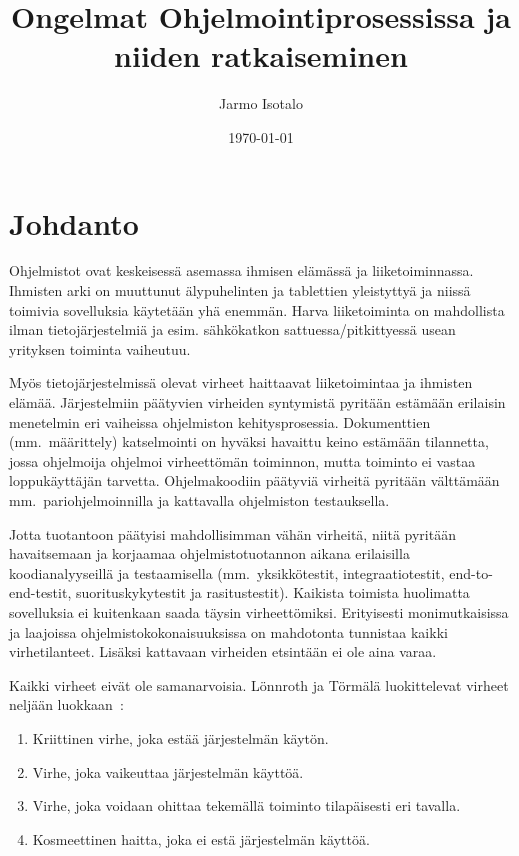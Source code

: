 \documentclass[finnish]{tktltiki2}
\title{Ongelmat Ohjelmointiprosessissa ja niiden ratkaiseminen}
\author{Jarmo Isotalo}
\date{\today}
\theoremstyle{definition}
\theoremstyle{remark}
\begin{document}

\frontmatter      %

\maketitle        %
\makeabstract     %

\tableofcontents  %


\mainmatter       %

\section{Johdanto}

Ohjelmistot ovat keskeisessä asemassa ihmisen elämässä ja liiketoiminnassa. Ihmisten arki on muuttunut älypuhelinten ja tablettien yleistyttyä ja niissä toimivia sovelluksia käytetään yhä enemmän. Harva liiketoiminta on mahdollista ilman tietojärjestelmiä ja esim. sähkökatkon sattuessa/pitkittyessä usean yrityksen toiminta vaiheutuu.

Myös tietojärjestelmissä olevat virheet haittaavat liiketoimintaa ja ihmisten elämää. Järjestelmiin päätyvien virheiden syntymistä pyritään estämään erilaisin menetelmin eri vaiheissa ohjelmiston kehitysprosessia. Dokumenttien (mm.\ määrittely) katselmointi on hyväksi havaittu keino estämään tilannetta, jossa ohjelmoija ohjelmoi virheettömän toiminnon, mutta toiminto ei vastaa loppukäyttäjän tarvetta. Ohjelmakoodiin päätyviä virheitä pyritään välttämään mm.\ pariohjelmoinnilla ja kattavalla ohjelmiston testauksella.

Jotta tuotantoon päätyisi mahdollisimman vähän virheitä, niitä pyritään havaitsemaan ja korjaamaa ohjelmistotuotannon aikana erilaisilla koodianalyyseillä ja testaamisella (mm.\ yksikkötestit, integraatiotestit, end-to-end-testit, suorituskykytestit ja rasitustestit). Kaikista toimista huolimatta sovelluksia ei kuitenkaan saada täysin virheettömiksi. Erityisesti monimutkaisissa ja laajoissa ohjelmistokokonaisuuksissa on mahdotonta tunnistaa kaikki virhetilanteet. Lisäksi kattavaan virheiden etsintään ei ole aina varaa.

Kaikki virheet eivät ole samanarvoisia. Lönnroth ja Törmälä luokittelevat virheet neljään luokkaan~\cite{testaus-kriittisyys}:
\begin{enumerate}
  \item Kriittinen virhe, joka estää järjestelmän käytön.
  \item Virhe, joka vaikeuttaa järjestelmän käyttöä.
  \item Virhe, joka voidaan ohittaa tekemällä toiminto tilapäisesti eri tavalla.
  \item Kosmeettinen haitta, joka ei estä järjestelmän käyttöä.
\end{enumerate}
\end{document}
